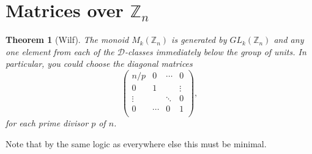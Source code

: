 \documentclass[11pt]{article}
\newtheorem{thm}{Theorem}[section]
\numberwithin{equation}{section}
\newcommand{\D}{\mathscr{D}}
\begin{document}
\section{Matrices over $\mathbb{Z}_n$}

\begin{thm}[Wilf]
  The monoid $M_{k}(\mathbb{Z}_{n})$ is generated by $GL_{k}(\mathbb{Z}_{n})$ and
  any one element from each of the $\D$-classes immediately below the group of
  units. In particular, you could choose
  the diagonal matrices
  $$\begin{pmatrix}
    n/p    & 0      & \cdots & 0  \\
    0      & 1      &        & \vdots \\
    \vdots &        & \ddots & 0 \\
    0      & \cdots & 0      & 1  \\
   \end{pmatrix},$$
   for each prime divisor $p$ of $n$.
\end{thm}
Note that by the same logic as everywhere else this must be minimal.

\printbibliography
\end{document}
